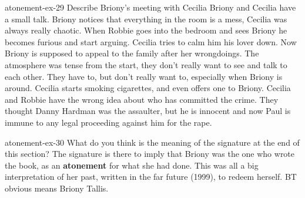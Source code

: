 \documentclass[preview]{standalone}
\begin{document}
\begin{snippetexercise}{atonement-ex-29}
    {Describe Briony's meeting with Cecilia}
    Briony and Cecilia have a small talk. Briony notices that everything in the room
    is a mess, Cecilia was always really chaotic.
    When Robbie goes into the bedroom and sees Briony he becomes furious
    and start arguing. Cecilia tries to calm him his lover down.
    Now Briony is supposed to appeal to the family after her wrongdoings.
    The atmosphere was tense from the start, they don't really want to see and talk to each other.
    They have to, but don't really want to, especially when Briony is around.
    Cecilia starts smoking cigarettes, and even offers one to Briony.
    Cecilia and Robbie have the wrong idea about who has committed the crime.
    They thought Danny Hardman was the assaulter, but he is innocent and now
    Paul is immune to any legal proceeding against him for the rape.
\end{snippetexercise}

\begin{snippetexercise}{atonement-ex-30}
    {What do you think is the meaning of the signature at the end of this section?}
    The signature is there to imply that Briony was the one who wrote the book,
    as an \textbf{atonement} for what she had done.
    This was all a big interpretation of her past,
    written in the far future (1999),
    to redeem herself.
    BT obvious means Briony Tallis.
\end{snippetexercise}
\end{document}
